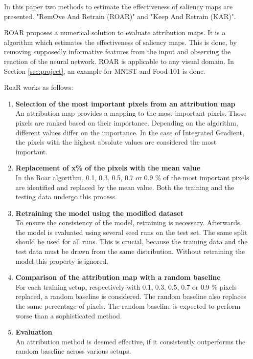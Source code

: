 In this paper two methods to estimate the effectiveness of saliency maps are presented. "RemOve And Retrain (ROAR)" and "Keep And Retrain (KAR)". 

ROAR proposes a numerical solution to evaluate attribution maps. It is a algorithm which estimates the effectiveness of saliency maps. This is done, by removing supposedly informative features from the input and observing the reaction of the neural network. ROAR is applicable to any visual domain. In Section \ref{sec:project}, an example for MNIST and Food-101 is done.


RoaR  works as follows:
\begin{enumerate}
	\item \textbf{ Selection of the most important pixels from an attribution map}\\
	An attribution map provides a mapping to the most important pixels. Those pixels are ranked based on their importance. Depending on the algorithm, different values differ on the importance. In the case of Integrated Gradient, the pixels with the highest absolute values are considered the most important.
	\item \textbf{ Replacement of x\% of the pixels with the mean value}\\
	In the Roar algorithm, 0.1, 0.3, 0.5, 0.7 or 0.9 \% of the most important pixels are identified and replaced by the mean value. Both the training and the testing data undergo this process.
	\item \textbf{ Retraining the model using the modified dataset}\\
	To ensure the consistency of the model, retraining is necessary. Afterwards, the model is evaluated using several seed runs on the test set. The same split should be used for all runs.
	This is crucial, because the training data and the test data must be drawn from the same distribution. Without retraining the model this property is ignored.
	\item \textbf{ Comparison of the attribution map with a random baseline} \\
	For each training setup, respectively with 0.1, 0.3, 0.5, 0.7 or 0.9 \% pixels replaced, a random baseline is considered. The random baseline also replaces the same percentage of pixels. The random baseline is expected to perform worse than a sophisticated method.
	\item \textbf{ Evaluation} \\
	An attribution method is deemed effective, if it consistently outperforms the random baseline across various setups.
\end{enumerate}

